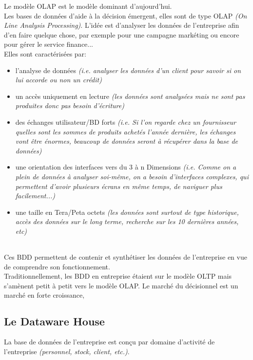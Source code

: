 \documentclass[a4paper,11pt]{article}
\begin{document}
		Le modèle OLAP est le modèle dominant d'aujourd'hui. \\
		
		Les bases de données d'aide à la décision émergent, elles sont de type OLAP \emph{(On Line Analysis Processing)}. L'idée est d'analyser les données de l'entreprise afin d'en faire quelque chose, par exemple pour une campagne markéting ou encore pour gérer le service finance...\\ 
		
		Elles sont caractérisées par:
		\begin{itemize}
			\item l'analyse de données \emph{(i.e. analyser les données d'un client pour savoir si on lui accorde ou non un crédit)}
			\item un accès uniquement en lecture \emph{(les données sont analysées mais ne sont pas produites donc pas besoin d'écriture)}
			\item des échanges utilisateur/BD forts \emph{(i.e. Si l'on regarde chez un fournisseur quelles sont les sommes de produits achetés l'année dernière, les échanges vont être énormes, beaucoup de données seront à récupérer dans la base de données)}
			\item une orientation des interfaces vers du 3 à n Dimensions \emph{(i.e. Comme on a plein de données à analyser soi-même, on a besoin d'interfaces complexes, qui permettent d'avoir plusieurs écrans en même temps, de naviguer plus facilement...)}
			\item une taille en Tera/Peta octets \emph{(les données sont surtout de type historique, accès des données sur le long terme, recherche sur les 10 dernières années, etc)}
		\end{itemize}
		~\\
		
		Ces BDD permettent de contenir et synthétiser les données de l'entreprise en vue de comprendre son fonctionnement.\\
		
		Traditionnellement, les BDD en entreprise étaient sur le modèle OLTP mais s'amènent petit à petit vers le modèle OLAP. Le marché du décisionnel est un marché en forte croissance, 
		
		\subsection{Le Dataware House}
		La base de données de l'entreprise est conçu par domaine d'activité de l'entreprise \emph{(personnel, stock, client, etc.)}. \\
		
\end{document}
